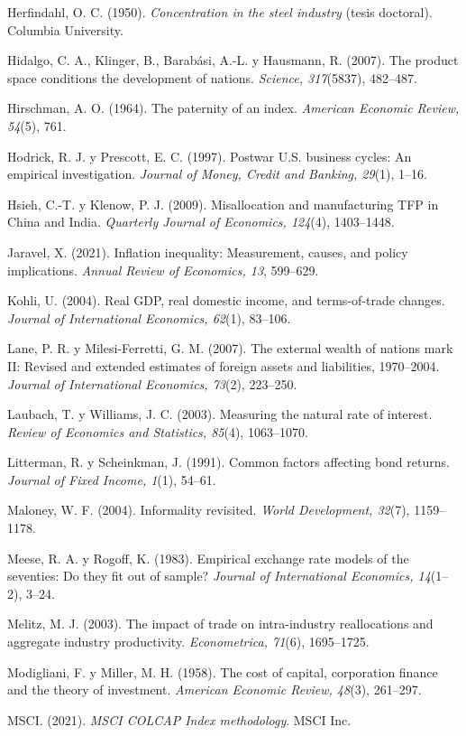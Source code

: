 Herfindahl, O. C. (1950). \emph{Concentration in the steel industry}
(tesis doctoral). Columbia University.

Hidalgo, C. A., Klinger, B., Barabási, A.-L. y Hausmann, R. (2007). The
product space conditions the development of nations. \emph{Science,
317}(5837), 482--487.

Hirschman, A. O. (1964). The paternity of an index. \emph{American
Economic Review, 54}(5), 761.

Hodrick, R. J. y Prescott, E. C. (1997). Postwar U.S. business cycles:
An empirical investigation. \emph{Journal of Money, Credit and Banking,
29}(1), 1--16.

Hsieh, C.-T. y Klenow, P. J. (2009). Misallocation and manufacturing TFP
in China and India. \emph{Quarterly Journal of Economics, 124}(4),
1403--1448.

Jaravel, X. (2021). Inflation inequality: Measurement, causes, and
policy implications. \emph{Annual Review of Economics, 13}, 599--629.

Kohli, U. (2004). Real GDP, real domestic income, and terms-of-trade
changes. \emph{Journal of International Economics, 62}(1), 83--106.

Lane, P. R. y Milesi-Ferretti, G. M. (2007). The external wealth of
nations mark II: Revised and extended estimates of foreign assets and
liabilities, 1970--2004. \emph{Journal of International Economics,
73}(2), 223--250.

Laubach, T. y Williams, J. C. (2003). Measuring the natural rate of
interest. \emph{Review of Economics and Statistics, 85}(4), 1063--1070.

Litterman, R. y Scheinkman, J. (1991). Common factors affecting bond
returns. \emph{Journal of Fixed Income, 1}(1), 54--61.

Maloney, W. F. (2004). Informality revisited. \emph{World Development,
32}(7), 1159--1178.

Meese, R. A. y Rogoff, K. (1983). Empirical exchange rate models of the
seventies: Do they fit out of sample? \emph{Journal of International
Economics, 14}(1--2), 3--24.

Melitz, M. J. (2003). The impact of trade on intra-industry
reallocations and aggregate industry productivity. \emph{Econometrica,
71}(6), 1695--1725.

Modigliani, F. y Miller, M. H. (1958). The cost of capital, corporation
finance and the theory of investment. \emph{American Economic Review,
48}(3), 261--297.

MSCI. (2021). \emph{MSCI COLCAP Index methodology}. MSCI Inc.

